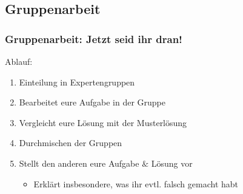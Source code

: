 \documentclass[18pt]{beamer}
\begin{document}
	\subsection{Gruppenarbeit}
	\begin{frame}
		\frametitle{Gruppenarbeit: Jetzt seid ihr dran!}
		Ablauf:
		\begin{enumerate}
			\item Einteilung in Expertengruppen
			\item Bearbeitet eure Aufgabe in der Gruppe
			\item Vergleicht eure Lösung mit der Musterlösung 
			\item Durchmischen der Gruppen
			\item Stellt den anderen eure Aufgabe $\&$ Lösung vor
			\begin{itemize}
				\item Erklärt insbesondere, was ihr evtl. falsch gemacht habt
			\end{itemize}
		\end{enumerate}
	\end{frame}
	
\end{document}
